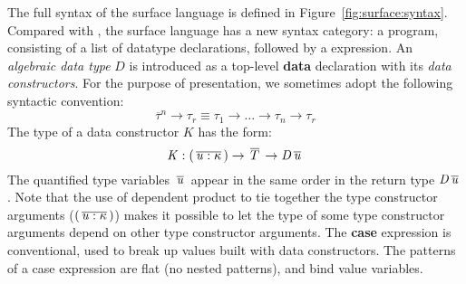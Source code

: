 The full syntax of the surface language is defined in Figure~\ref{fig:surface:syntax}. Compared with \name, the surface language has a new syntax category: a program, consisting of a list of datatype declarations, followed by a expression. An \emph{algebraic data type} $D$ is introduced as a top-level \textbf{data} declaration with its \emph{data constructors}. For the purpose of presentation, we sometimes adopt the following syntactic convention:
\[
\overline{\tau}^n \rightarrow \tau_r \equiv \tau_1 \rightarrow \dots \rightarrow \tau_n \rightarrow \tau_r
\]
The type of a data constructor $K$ has the form:
\[
\mathit{K}  :  (  \,\overline{  \mathit{u}  :  \kappa  }\,  )  \rightarrow  \,\overline{  T  }\,  \rightarrow  \mathit{D}    \,\overline{  \mathit{u}  }\,
\]
The quantified type variables $\,\overline{  \mathit{u}  }\,$ appear in the same order in
the return type $\mathit{D}    \,\overline{  \mathit{u}  }\,$. Note that the use of dependent product
to tie together the type constructor arguments ($(  \,\overline{  \mathit{u}  :  \kappa  }\,  )$) makes
it possible to let the type of some type constructor arguments depend
on other type constructor arguments. The \textbf{case} expression is
conventional, used to break up values built with data constructors.
The patterns of a case expression are flat (no nested patterns), and
bind value variables.

